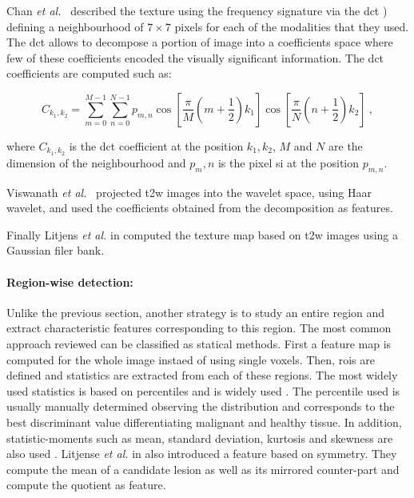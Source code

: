 Chan \textit{et al.}~\cite{Chan2003} described the texture using the frequency signature via the \acf{dct} \cite{Ahmed1974}) defining a neighbourhood of $7 \times 7$ pixels for each of the modalities that they used.
The \ac{dct} allows to decompose a portion of image into a coefficients space where few of these coefficients encoded the visually significant information.
The \ac{dct} coefficients are computed such as:

\begin{equation}
	C_{k_1,k_2} = \sum_{m=0}^{M-1} \sum_{n=0}^{N-1} p_{m,n} \cos \left[ \frac{\pi}{M} \left( m + \frac{1}{2} \right) k_1 \right] \cos \left[ \frac{\pi}{N} \left( n + \frac{1}{2} \right) k_2 \right] \ ,
\end{equation}

\noindent where $C_{k_1,k_2}$ is the \ac{dct} coefficient at the position $k_1,k_2$, $M$ and $N$ are the dimension of the neighbourhood and $p_m,n$ is the pixel \ac{si} at the position $p_{m,n}$.

Viswanath \textit{et al.}~\cite{Viswanath2012} projected \ac{t2w} images into the wavelet space, using Haar wavelet, and used the coefficients obtained from the decomposition as features.

Finally Litjens \textit{et al.} in \cite{Litjens2011} computed the texture map based on \ac{t2w} images using a Gaussian filer bank.




\paragraph{Region-wise detection:}

Unlike the previous section, another strategy is to study an entire region and extract characteristic features corresponding to this region.
The most common approach reviewed can be classified as statical methods.
First a feature map is computed for the whole image instaed of using single voxels.
Then, \acp{roi} are defined and statistics are extracted from each of these regions.
The most widely used statistics is based on percentiles and is widely used \cite{Antic2013,Litjens2011,Litjens2012,Litjense2014,Peng2013,Tiwari2009a,Tiwari2010,Tiwari2013,Viswanath2008,Viswanath2008a,Viswanath2011,Viswanath2012,Vos2008,Vos2008a,Vos2010,Vos2012}.
The percentile used is usually manually determined observing the distribution and corresponds to the best discriminant value differentiating malignant and healthy tissue.
In addition, statistic-moments such as mean, standard deviation, kurtosis and skewness are also used \cite{Ampeliotis2007,Ampeliotis2008,Antic2013,Niaf2011,Niaf2012,Peng2013}.
Litjense \textit{et al.} in \cite{Litjense2014} also introduced a feature based on symmetry.
They compute the mean of a candidate lesion as well as its mirrored counter-part and compute the quotient as feature.

